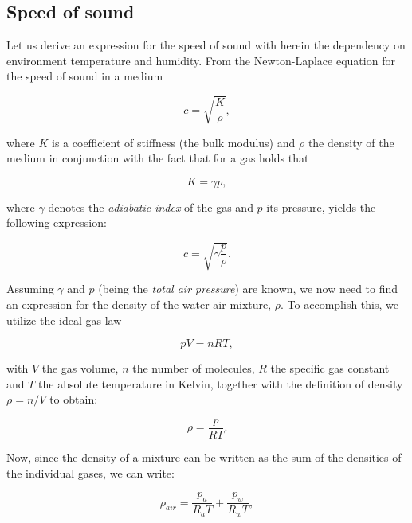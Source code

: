 \documentclass[11pt,titlepage]{report}
\begin{document}
\begin{appendices}
\renewcommand{\chapternumber}{\appendixname\space\thechapter} 

\chapter{Speed of sound}
\label{app:speed-of-sound}
Let us derive an expression for the speed of sound with herein the dependency on environment temperature and humidity. From the Newton-Laplace equation for the speed of sound in a medium

\begin{equation}
	c = \sqrt{\frac{K}{\rho}},
\end{equation}

where $K$ is a coefficient of stiffness (the bulk modulus) and $\rho$ the density of the medium in conjunction with the fact that for a gas holds that

\begin{equation}
	K = \gamma p,
\end{equation}

where $\gamma$ denotes the \emph{adiabatic index} of the gas and $p$ its pressure, yields the following expression:

\begin{equation} \label{eq:c1}
	c = \sqrt{\gamma \frac{p}{\rho}}.
\end{equation}

Assuming $\gamma$ and $p$ (being the \emph{total air pressure}) are known, we now need to find an expression for the density of the water-air mixture, $\rho$.
To accomplish this, we utilize the ideal gas law

\begin{equation}
	p V = n R T,
\end{equation}

with $V$ the gas volume, $n$ the number of molecules, $R$ the specific gas constant and $T$ the absolute temperature in Kelvin, together with the definition of density $\rho = n / V$ to obtain:

\begin{equation}
	\rho = \frac{p}{R T}.
\end{equation}

Now, since the density of a mixture can be written as the sum of the densities of the individual gases, we can write:

\begin{equation} \label{eq:rho1}
	\rho_{air} = \frac{p_a}{R_a T} + \frac{p_w}{R_w T},
\end{equation}


\end{appendices}
\end{document}
